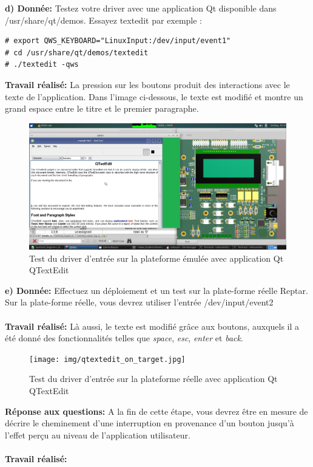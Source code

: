 \textbf{d) Donnée: }Testez votre driver avec une application Qt disponible dans /usr/share/qt/demos. Essayez textedit
par exemple : 
\begin{lstlisting}
# export QWS_KEYBOARD="LinuxInput:/dev/input/event1"
# cd /usr/share/qt/demos/textedit
# ./textedit -qws 
\end{lstlisting}
\textbf{Travail réalisé: }
La pression sur les boutons produit des interactions avec le texte de l'application. Dans l'image ci-dessous, le texte est modifié et montre un grand espace entre le titre et le premier paragraphe.
\begin{figure}[H]
	\begin{center}
		\includegraphics[width=17cm]{img/qtextedit_test_emulator.png}
		\caption{Test du driver d'entrée sur la plateforme émulée avec application Qt QTextEdit}
		\label{qtextedit_device_input_emul}
	\end{center}
\end{figure}

\textbf{e) Donnée: }Effectuez un déploiement et un test sur la plate-forme réelle Reptar. Sur la plate-forme réelle, vous
devrez utiliser l'entrée /dev/input/event2\\\\
\textbf{Travail réalisé: }Là aussi, le texte est modifié grâce aux boutons, auxquels il a été donné des fonctionnalités telles que \textit{space}, \textit{esc}, \textit{enter} et \textit{back}.
\begin{figure}[H]
	\begin{center}
		\texttt{[image: img/qtextedit\_on\_target.jpg]}
		\caption{Test du driver d'entrée sur la plateforme réelle avec application Qt QTextEdit}
		\label{qtextedit_device_input_reptar}
	\end{center}
\end{figure}

\color{red}
\textbf{Réponse aux questions: }A la fin de cette étape, vous devrez être en mesure de décrire le cheminement d'une interruption
en provenance d'un bouton jusqu'à l'effet perçu au niveau de l’application utilisateur. \\\\
\textbf{Travail réalisé: }\\\\\color{black}

